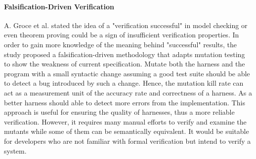 \paragraph{Falsification-Driven Verification} A. Groce et al. \cite{7372062} stated the idea of a "verification successful" in model checking or even theorem proving could be a sign of insufficient verification properties. In order to gain more knowledge of the meaning behind "successful" results, the study proposed a falsification-driven methodology that adapts mutation testing to show the weakness of current specification. Mutate both the harness and the program with a small syntactic change assuming a good test suite should be able to detect a bug introduced by such a change. Hence, the mutation kill rate can act as a measurement unit of the accuracy rate and correctness of a harness. As a better harness should able to detect more errors from the implementation. This approach is useful for ensuring the quality of harnesses, thus a more reliable verification. However, it requires many manual efforts to verify and examine the mutants while some of them can be semantically equivalent. It would be suitable for developers who are not familiar with formal verification but intend to verify a system.






